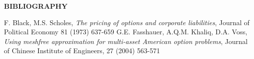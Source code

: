 \documentclass[12pt]{article}
\numberwithin{equation}{section} %
\begin{document}
\newpage
\begin{center}
{\bf BIBLIOGRAPHY}
\end{center}
\begin{thebiblio}{99}



F. Black, M.S. Scholes, \emph{The pricing of options and corporate
liabilities}, Journal of Political Economy 81 (1973) 637-659
G.E. Fasshauer, A.Q.M. Khaliq, D.A. Voss, \emph{Using meshfree
approximation for multi-asset American option problems}, Journal of
Chinese Institute of Engineers, 27 (2004) 563-571


\end{thebiblio}
\end{document}
